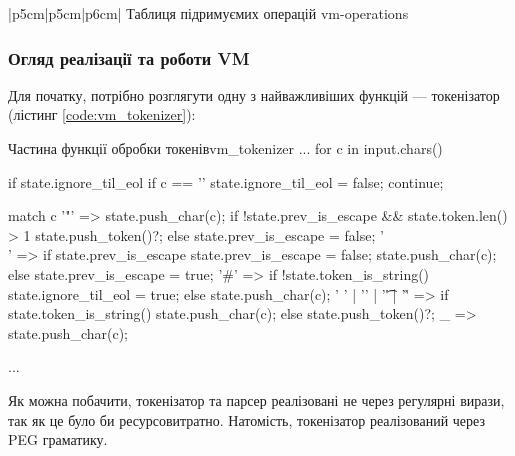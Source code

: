 \documentclass{lib/styles/default-style}
\begin{document}
        {|p{5cm}|p{5cm}|p{6cm}|}
        {Таблиця підримуємих операцій}
        {vm-operations}
    
    \subsubsection{Огляд реалізації та роботи VM}
        Для початку, потрібно розглягути одну з найважливіших функцій --- токенізатор (лістинг \ref{code:vm_tokenizer}):

        \begin{code}{Частина функції обробки токенів}{vm_tokenizer}
            ...
            for c in input.chars() {
                if state.ignore_til_eol {
                    if c == '\n' {
                        state.ignore_til_eol = false;
                    }
                    continue;
                }

                match c {
                    '"' => {
                        state.push_char(c);
                        if !state.prev_is_escape && state.token.len() > 1 {
                            state.push_token()?;
                        } else {
                            state.prev_is_escape = false;
                        }
                    }
                    '\\' => {
                        if state.prev_is_escape {
                            state.prev_is_escape = false;
                            state.push_char(c);
                        } else {
                            state.prev_is_escape = true;
                        }
                    }
                    '#' => {
                        if !state.token_is_string() {
                            state.ignore_til_eol = true;
                        } else {
                            state.push_char(c);
                        }
                    }
                    ' ' | '\n' | '\t' | '\r' => {
                        if state.token_is_string() {
                            state.push_char(c);
                        } else {
                            state.push_token()?;
                        }
                    }
                    _ => {
                        state.push_char(c);
                    }
                }
            }
            ...\end{code}

    Як можна побачити, токенізатор та парсер реалізовані не через регулярні вирази, так як це було би ресурсовитратно.
    Натомість, токенізатор реалізований через PEG граматику.
\end{document}

